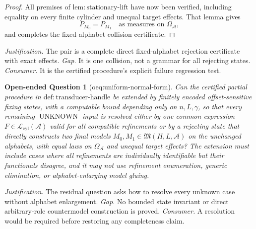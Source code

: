 \documentclass{article}
\newtheorem{openendedquestion}{Open-ended Question}
\begin{document}
\begin{proof}
All premises of \(\mathrm{lem:stationary\text{-}lift}\) have now been verified, including equality on every finite cylinder and unequal target effects.  That lemma gives
\[
 P_{M_0}=P_{M_1}\quad\text{as measures on }\Omega_{\mathcal A},
\]
and completes the fixed-alphabet collision certificate.
\end{proof}
\par\smallskip\noindent \textit{Justification.} The pair is a complete direct fixed-alphabet rejection certificate with exact effects. \textit{Gap.} It is one collision, not a grammar for all rejecting states. \textit{Consumer.} It is the certified procedure's explicit failure regression test.

\begin{openendedquestion}[oeq:uniform-normal-form]\label{oeq:uniform-normal-form}
Can the certified partial procedure in \(\mathrm{def:transducer\text{-}handle}\) be extended by finitely encoded offset-sensitive fixing states, with a computable bound depending only on \(n,L,\gamma\), so that every remaining \(\operatorname{UNKNOWN}\) input is resolved either by one common expression \(F\in\mathcal L_{\mathrm{cyl}}(\mathcal A)\) valid for all compatible refinements or by a rejecting state that directly constructs two final models \(M_0,M_1\in\mathfrak M(H,L,\mathcal A)\) on the unchanged alphabets, with equal laws on \(\Omega_{\mathcal A}\) and unequal target effects?  The extension must include cases where all refinements are individually identifiable but their functionals disagree, and it may not use refinement enumeration, generic elimination, or alphabet-enlarging model gluing.
\end{openendedquestion}
\par\smallskip\noindent \textit{Justification.} The residual question asks how to resolve every unknown case without alphabet enlargement. \textit{Gap.} No bounded state invariant or direct arbitrary-role countermodel construction is proved. \textit{Consumer.} A resolution would be required before restoring any completeness claim.
\end{document}
